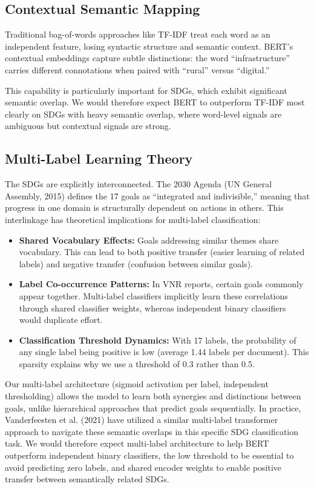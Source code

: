 \documentclass[12pt,a4paper]{article}
\begin{document}
\subsection{Contextual Semantic Mapping}\label{sec:contextual}

Traditional bag-of-words approaches like TF-IDF treat each word as an independent feature, losing syntactic structure and semantic context. BERT's contextual embeddings capture subtle distinctions: the word ``infrastructure'' carries different connotations when paired with ``rural'' versus ``digital.''

This capability is particularly important for SDGs, which exhibit significant semantic overlap. We would therefore expect BERT to outperform TF-IDF most clearly on SDGs with heavy semantic overlap, where word-level signals are ambiguous but contextual signals are strong.

\subsection{Multi-Label Learning Theory}\label{sec:multilabel}

The SDGs are explicitly interconnected. The 2030 Agenda (UN General Assembly, 2015) defines the 17 goals as ``integrated and indivisible,'' meaning that progress in one domain is structurally dependent on actions in others. This interlinkage has theoretical implications for multi-label classification:

\begin{itemize}
\item \textbf{Shared Vocabulary Effects:} Goals addressing similar themes share vocabulary. This can lead to both positive transfer (easier learning of related labels) and negative transfer (confusion between similar goals).
\item \textbf{Label Co-occurrence Patterns:} In VNR reports, certain goals commonly appear together. Multi-label classifiers implicitly learn these correlations through shared classifier weights, whereas independent binary classifiers would duplicate effort.
\item \textbf{Classification Threshold Dynamics:} With 17 labels, the probability of any single label being positive is low (average 1.44 labels per document). This sparsity explains why we use a threshold of 0.3 rather than 0.5.
\end{itemize}

Our multi-label architecture (sigmoid activation per label, independent thresholding) allows the model to learn both synergies and distinctions between goals, unlike hierarchical approaches that predict goals sequentially. In practice, Vanderfeesten et al. (2021) have utilized a similar multi-label transformer approach to navigate these semantic overlaps in this specific SDG classification task. We would therefore expect multi-label architecture to help BERT outperform independent binary classifiers, the low threshold to be essential to avoid predicting zero labels, and shared encoder weights to enable positive transfer between semantically related SDGs.
\end{document}
